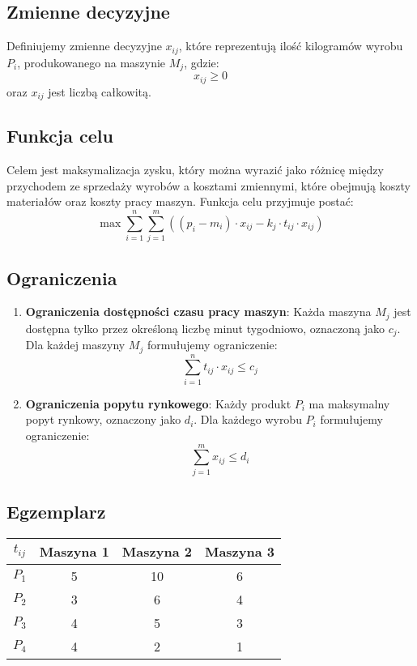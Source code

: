 \documentclass[12pt, letterpaper]{article}
\begin{document}
\subsection{Zmienne decyzyjne}
Definiujemy zmienne decyzyjne \( x_{ij} \), które reprezentują ilość kilogramów
wyrobu \( P_i \), produkowanego na maszynie \( M_j \), gdzie:
\[
  x_{ij} \geq 0
\]
oraz \( x_{ij} \) jest liczbą całkowitą.

\subsection{Funkcja celu}
Celem jest maksymalizacja zysku, który można wyrazić jako różnicę między
przychodem ze sprzedaży wyrobów a kosztami zmiennymi, które obejmują koszty
materiałów oraz koszty pracy maszyn. Funkcja celu przyjmuje postać:
\[
  \max \sum_{i=1}^n \sum_{j=1}^m \left( \left( p_i - m_i \right) \cdot	x_{ij}
  - k_j \cdot t_{ij} \cdot x_{ij} \right)
\]

\subsection{Ograniczenia}
\begin{enumerate}
  \item \textbf{Ograniczenia dostępności czasu pracy maszyn}: Każda maszyna \(
        M_j \) jest dostępna tylko przez określoną liczbę minut tygodniowo,
        oznaczoną
        jako \( c_j \). Dla każdej maszyny \( M_j \) formułujemy ograniczenie:
        \[
          \sum_{i=1}^n t_{ij} \cdot x_{ij} \leq c_j
        \]

  \item \textbf{Ograniczenia popytu rynkowego}: Każdy produkt \( P_i \) ma
        maksymalny popyt rynkowy, oznaczony jako \( d_i \). Dla każdego wyrobu
        \( P_i
        \) formułujemy ograniczenie:
        \[
          \sum_{j=1}^m x_{ij} \leq d_i
        \]
\end{enumerate}

\subsection{Egzemplarz}

\begin{center}
  \begin{tabular}{|c|c|c|c|}
    \hline
    \( t_{ij} \) & Maszyna 1 & Maszyna 2 & Maszyna 3 \\
    \hline
    \( P_1 \)    & 5         & 10        & 6         \\
    \( P_2 \)    & 3         & 6         & 4         \\
    \( P_3 \)    & 4         & 5         & 3         \\
    \( P_4 \)    & 4         & 2         & 1         \\
    \hline
  \end{tabular}
\end{center}
\end{document}
